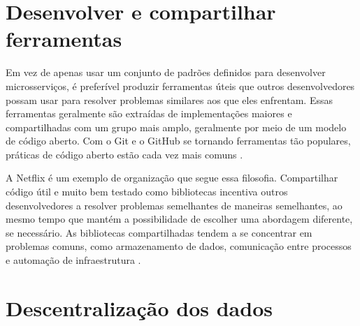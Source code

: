 

\section{Desenvolver e compartilhar ferramentas}
Em vez de apenas usar um conjunto de padrões definidos para desenvolver microsserviços, é preferível produzir ferramentas úteis que outros desenvolvedores possam usar para resolver problemas similares aos que eles enfrentam. Essas ferramentas geralmente são extraídas de implementações maiores e compartilhadas com um grupo mais amplo, geralmente por meio de um modelo de código aberto. Com o Git e o GitHub se tornando ferramentas tão populares, práticas de código aberto estão cada vez mais comuns \cite{martin-fowler-microservices}.


A Netflix é um exemplo de organização que segue essa filosofia. Compartilhar código útil e muito bem testado como bibliotecas incentiva outros desenvolvedores a resolver problemas semelhantes de maneiras semelhantes, ao mesmo tempo que mantém a possibilidade de escolher uma abordagem diferente, se necessário. As bibliotecas compartilhadas tendem a se concentrar em problemas comuns, como armazenamento de dados, comunicação entre processos e automação de infraestrutura \cite{martin-fowler-microservices}.

\section{Descentralização dos dados}


